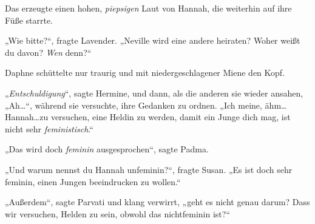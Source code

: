 Das erzeugte einen hohen, \emph{piepsigen} Laut von Hannah, die weiterhin auf ihre Füße starrte.

„Wie bitte?“, fragte Lavender. „Neville wird eine andere heiraten? Woher weißt du davon? \emph{Wen} denn?“

Daphne schüttelte nur traurig und mit niedergeschlagener Miene den Kopf.

„\emph{Entschuldigung}“, sagte Hermine, und dann, als die anderen sie wieder ansahen, „Ah…“, während sie versuchte, ihre Gedanken zu ordnen. „Ich meine, ähm…Hannah…zu versuchen, eine Heldin zu werden, damit ein Junge dich mag, ist nicht sehr \emph{feministisch}.“

„Das wird doch \emph{feminin} ausgesprochen“, sagte Padma.

„Und warum nennst du Hannah unfeminin?“, fragte Susan. „Es ist doch sehr feminin, einen Jungen beeindrucken zu wollen.“

„Außerdem“, sagte Parvati und klang verwirrt, „geht es nicht genau darum? Dass wir versuchen, Helden zu sein, obwohl das nichtfeminin ist?“

